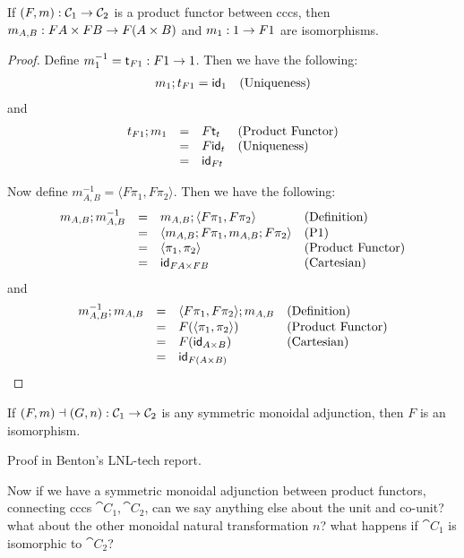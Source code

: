 \begin{lemma}
  \label{lemma:product_functors_iso}
  If $(F,m) : \mathcal{C}_1 \rightarrow \mathcal{C}_2$ is a product functor between cccs, then
  $m_{A,B} : FA \times FB \rightarrow F(A \times B)$ and $m_1 : 1 \rightarrow F1$ are
  isomorphisms.
\end{lemma}
\begin{proof}
  Define $m^{-1}_1 = \mathsf{t}_{F 1} : F1 \rightarrow 1$.  Then we have the following:
  \[
  \begin{array}{lll}
    m_1;t_{F1} = \mathsf{id}_{1} & \text{(Uniqueness)}\\    
  \end{array}
  \]
  and
  \[
  \begin{array}{llll}
    t_{F1};m_1
    & = & F\mathsf{t}_t & \text{(Product Functor)}\\
    & = & F\mathsf{id}_t & \text{(Uniqueness)}\\
    & = & \mathsf{id}_{Ft}     
  \end{array}
  \]

  Now define $m^{-1}_{A,B} = \langle F\pi_1, F\pi_2 \rangle$.  Then we have the following:
  \[
  \begin{array}{llll}
    m_{A,B};m^{-1}_{A,B}
    & = & m_{A,B};\langle F\pi_1, F\pi_2 \rangle & \text{(Definition)}\\
    & = & \langle m_{A,B};F\pi_1, m_{A,B};F\pi_2 \rangle & \text{(P1)}\\
    & = & \langle \pi_1, \pi_2 \rangle & \text{(Product Functor)}\\
    & = & \mathsf{id}_{FA \times FB} & \text{(Cartesian)}\\
  \end{array}
  \]
  and
  \[
  \begin{array}{llll}
    m^{-1}_{A,B};m_{A,B}
    & = & \langle F\pi_1, F\pi_2 \rangle;m_{A,B} & \text{(Definition)}\\
    & = & F(\langle \pi_1, \pi_2 \rangle) & \text{(Product Functor)}\\
    & = & F(\mathsf{id}_{A \times B}) & \text{(Cartesian)}\\
    & = & \mathsf{id}_{F(A \times B)}\\    
  \end{array}
  \]
\end{proof}

\begin{lemma}
  \label{lemma:product_functors_iso}
  If $(F,m)\dashv (G,n) : \mathcal{C}_1 \rightarrow \mathcal{C}_2$ is any symmetric monoidal adjunction, then
  $F$  is an 
  isomorphism. 
\end{lemma}
Proof in Benton's LNL-tech report.

Now if we have a symmetric monoidal adjunction between product functors, connecting cccs $\cat{C}_1, \cat{C}_2$, can we say anything else about the unit and co-unit? what about the other monoidal natural transformation $n$? what happens if $\cat{C}_1$ is isomorphic to $\cat{C}_2$?